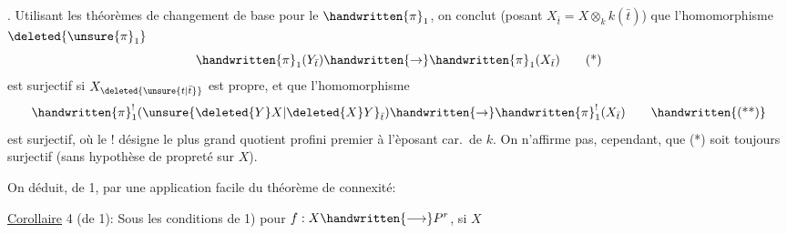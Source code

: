 \uline{} . Utilisant les théorèmes de changement de base pour le $\handwritten{\pi}_1$, on conclut  (posant $X_{\bar{t}}=X\otimes_k k(\bar{t})$) que l'homomorphisme $\deleted{\unsure{\pi}_1}$
\[
\handwritten{\pi}_1(Y_{\bar{t}})\handwritten{\rightarrow}\handwritten{\pi}_1(X_{\bar{t}})\tag*{(*)}
\]
est surjectif si $X_{\deleted{\unsure{t|\bar{t}}}}$ est propre, et que l'homomorphisme
\[
\handwritten{\pi}_1^{!}(\unsure{\deleted{Y}X|\deleted{X}Y}_{\bar{t}})\handwritten{\rightarrow}\handwritten{\pi}_1^{!}(X_{\bar{t}})\tag*{\handwritten{(**)}}
\]
est surjectif, où le ! désigne le plus grand quotient profini premier à l'èposant car.\ de $k$. On n'affirme pas, cependant, que (*) soit toujours surjectif (sans hypothèse de propreté sur $X$).

On déduit, de 1, par une application facile du théorème de connexité:

\uline{Corollaire} 4 (de 1): Sous les conditions de 1) pour $f:X\handwritten{\longrightarrow}P^r$, si $X$

